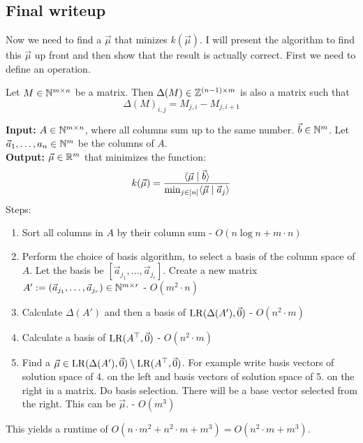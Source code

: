 \subsection{Final writeup}
Now we need to find a $\vec\mu$ that minizes $k(\vec\mu)$. I will present the algorithm to find this $\vec\mu$ up front and then show that the result is actually correct. First we need to define an operation. 
\begin{definition}
    Let $M \in \mathbb{N}^{m\times n}$ be a matrix. Then $\Delta(M) \in \mathbb{Z}^{(n-1)\times m}$ is also a matrix such that 
    $$\Delta(M)_{i,j} = M_{j,i} - M_{j,i+1}$$
\end{definition}

\begin{algorithm}
    \label{algo}
    \textbf{Input: } $A\in\mathbb{N}^{m\times n}$, where all columns sum up to the same number. $\vec b \in \mathbb{N}^m$. Let $\vec a_1, \dots, a_n\in\mathbb{N}^m$ be the columns of $A$.\\
    \textbf{Output: } $\vec\mu\in\mathbb{R}^m$ that minimizes the function:
    $$k(\vec\mu) = \frac{\langle \vec\mu \mid \vec b \rangle}{\min_{j\in[n]}\langle \vec\mu \mid \vec a_j \rangle}$$
    Steps:
    \begin{enumerate}
        \item Sort all columns in $A$ by their column sum - $O(n \log n + m \cdot n)$
        \item Perform the choice of basis algorithm, to select a basis of the column space of $A$. Let the basis be $[\vec a_{j_1}, \dots, \vec a_{j_r}]$. Create a new matrix $A' := (\vec a_{j_1}, \dots, \vec a_{j_r}) \in \mathbb{N}^{m \times r}$ - $O(m^2 \cdot n)$
        \item Calculate $\Delta(A')$ and then a basis of $\operatorname{LR}(\Delta(A'), \vec0)$ - $O(n^2 \cdot m)$
        \item Calculate a basis of $\operatorname{LR}(A^\top, \vec0)$ - $O(n^2 \cdot m)$
        \item Find a $\vec\mu \in \operatorname{LR}(\Delta(A'), \vec0) \setminus \operatorname{LR}(A^\top, \vec0)$. For example write basis vectors of solution space of 4. on the left and basis vectors of solution space of 5. on the right in a matrix. Do basis selection. There will be a base vector selected from the right. This can be $\vec\mu$. - $O(m^3)$
    \end{enumerate}
    This yields a runtime of $O(n \cdot m^2 + n^2 \cdot m + m^3) = O(n^2 \cdot m + m^3)$.
\end{algorithm}

